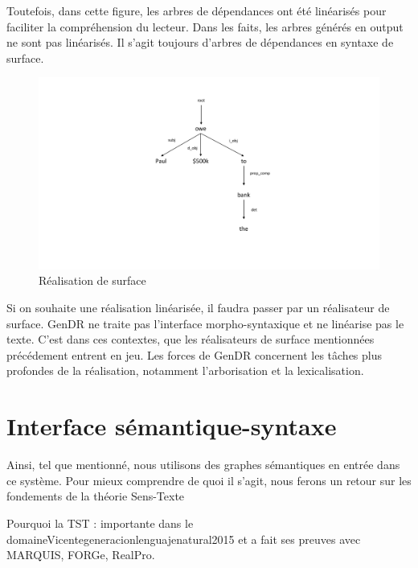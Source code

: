 Toutefois, dans cette figure, les arbres de dépendances ont été linéarisés pour faciliter la compréhension du lecteur. Dans les faits, les arbres générés en output ne sont pas linéarisés. Il s'agit toujours d'arbres de dépendances en syntaxe de surface. 

\begin{figure}[htb]
	\centering
	\includegraphics[width=1\textwidth, trim = {0cm 0cm 0cm 0cm},clip]{ch3/figs/realsurfex.pdf}
	\caption{Réalisation de surface}
	\label{fig:realsurfex}
\end{figure}

Si on souhaite une réalisation linéarisée,  il faudra passer par un réalisateur de surface. GenDR ne traite pas l'interface morpho-syntaxique et ne linéarise pas le texte. C'est dans ces contextes, que les réalisateurs de surface mentionnées précédement entrent en jeu. Les forces de GenDR concernent les tâches plus profondes de la réalisation, notamment l'arborisation et la lexicalisation.


\section{Interface sémantique-syntaxe}

Ainsi, tel que mentionné, nous utilisons des graphes sémantiques en entrée dans ce système. Pour mieux comprendre de quoi il s'agit, nous ferons un retour sur les fondements de la théorie Sens-Texte

Pourquoi la TST : importante dans le domaine{Vicentegeneracionlenguajenatural2015} et a fait ses preuves avec MARQUIS, FORGe, RealPro.

